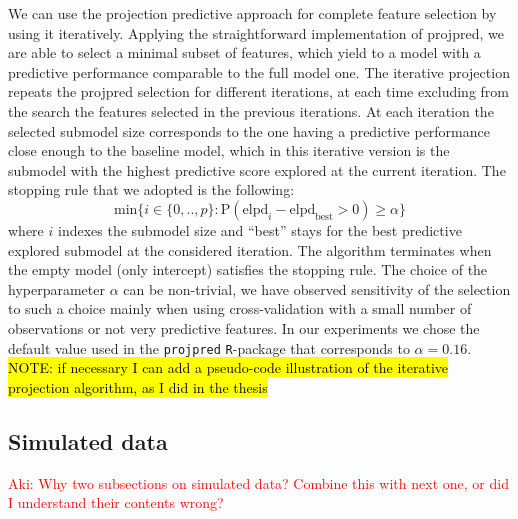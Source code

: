 \documentclass[american,]{article}
\theoremstyle{definition}
\newcommand{\note}[1]{\textcolor{red}{#1}}
\begin{document}
We can use the projection predictive approach for complete feature
selection by using it iteratively.  Applying the straightforward
implementation of projpred, we are able to select a minimal subset of
features, which yield to a model with a predictive performance
comparable to the full model one.  The iterative projection repeats
the projpred selection for different iterations, at each time
excluding from the search the features selected in the previous
iterations. At each iteration the selected submodel size corresponds to the
one having a predictive performance close enough to the baseline
model, which in this iterative version is the submodel with the
highest predictive score explored at the current iteration. The
stopping rule that we adopted is the following:
\begin{equation} 
\label{eq:rule_of_thumb}
\text{min} \{i\in \{0,..,p\}: \text{P}(\text{elpd}_{i}-\text{elpd}_{\text{best}}>0)\geq \alpha \}
\end{equation}
where $i$ indexes the submodel size and ``best'' stays for the best predictive explored submodel
at the considered iteration. The algorithm terminates when the empty model (only intercept) satisfies
the stopping rule.
The choice of the hyperparameter $\alpha$ can be non-trivial, we have 
observed sensitivity of the selection to such a choice mainly when using cross-validation with a small
number of observations or not very predictive features. 
In our experiments we chose the default value used in the \texttt{projpred} 
\texttt{R}-package that corresponds to $\alpha=0.16$.
\hl{NOTE: if necessary I can add a pseudo-code illustration of the iterative projection algorithm, as 
I did in the thesis}


\subsection{Simulated data}

\note{Aki: Why two subsections on simulated data? Combine this with next one, or did I understand their contents wrong?}
\end{document}
